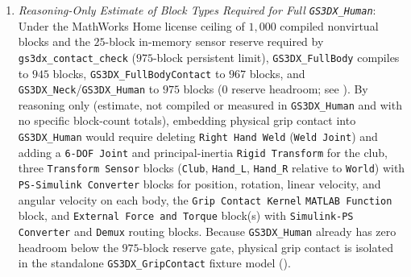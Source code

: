 \documentclass[11pt,a4paper]{article}
\begin{document}
\begin{enumerate}[leftmargin=*,noitemsep]
\item \textit{Reasoning-Only Estimate of Block Types Required for Full \texttt{GS3DX\_Human}}: Under the MathWorks Home license ceiling of $1{,}000$ compiled nonvirtual blocks and the $25$-block in-memory sensor reserve required by \texttt{gs3dx\_contact\_check} ($975$-block persistent limit), \texttt{GS3DX\_FullBody} compiles to $945$ blocks, \texttt{GS3DX\_FullBodyContact} to $967$ blocks, and \texttt{GS3DX\_Neck}/\texttt{GS3DX\_Human} to $975$ blocks ($0$ reserve headroom; see ). By reasoning only (estimate, not compiled or measured in \texttt{GS3DX\_Human} and with no specific block-count totals), embedding physical grip contact into \texttt{GS3DX\_Human} would require deleting \texttt{Right Hand Weld} (\texttt{Weld Joint}) and adding a \texttt{6-DOF Joint} and principal-inertia \texttt{Rigid Transform} for the club, three \texttt{Transform Sensor} blocks (\texttt{Club}, \texttt{Hand\_L}, \texttt{Hand\_R} relative to \texttt{World}) with \texttt{PS-Simulink Converter} blocks for position, rotation, linear velocity, and angular velocity on each body, the \texttt{Grip Contact Kernel} \texttt{MATLAB Function} block, and \texttt{External Force and Torque} block(s) with \texttt{Simulink-PS Converter} and \texttt{Demux} routing blocks. Because \texttt{GS3DX\_Human} already has zero headroom below the $975$-block reserve gate, physical grip contact is isolated in the standalone \texttt{GS3DX\_GripContact} fixture model ().
\end{enumerate}
\end{document}
